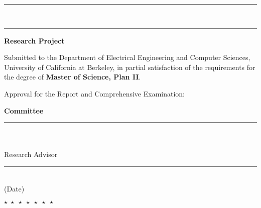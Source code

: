 \setlength{\rulewidth}{2.5in}
\setlength{\ruleheight}{0.5pt}

\begin{titlepage}
\begin{addmargin}{0.45in}

\begin{center}
    \rule{\linewidth}{}
    \vspace*{2ex}

    \makeatletter
    \begin{LARGE}
        \textbf{\@title}
    \end{LARGE}
    \\ [3ex]
    \begin{large}
        \@author
    \end{large}
    \makeatother

    \vspace*{2ex}
    \rule{\linewidth}{}
\end{center}

\vspace*{2ex}
\begin{center}
    \begin{large}
        \textbf{Research Project}
    \end{large}
\end{center}

\noindent
Submitted to the Department of Electrical Engineering and Computer Sciences, University of California at Berkeley, in partial satisfaction of the requirements for the degree of \textbf{Master of Science, Plan II}.

\vspace*{5ex}
\noindent
Approval for the Report and Comprehensive Examination:

\vspace*{2ex}
\begin{center}
    \textbf{Committee}

    \begin{small}
        \vspace*{8ex}
        \rule{}{} \\
        \researchadvisor \\
        Research Advisor

        \vspace*{5ex}
        \rule{}{} \\
        (Date)

        \vspace*{5ex}
        \(\star\; \star\; \star\; \star\; \star\; \star\; \star\)


\end{small}
\end{center}
\end{addmargin}
\end{titlepage}
